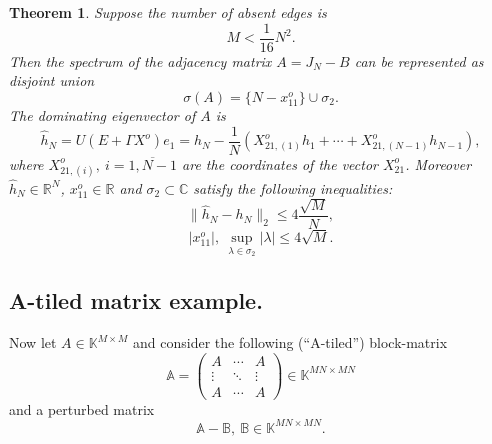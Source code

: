 \documentclass[a4paper]{jpconf}
\newtheorem{nkjpcsthm}{Theorem}
\begin{document}
\begin{nkjpcsthm}
    Suppose the number of absent edges is
    \[ M < \frac{1}{16} N^2. \]
    Then the spectrum of the adjacency matrix \( A = J_N - B \)
        can be represented as disjoint union
    \[
        \sigma(A) = \{ N - x_{11}^o \} \cup \sigma_2.
    \]
    The dominating eigenvector of \( A \) is
    \[
        \hat{h}_N = U(E+\Gamma X^o) e_1 =
            h_N - \frac1N (X_{21,(1)}^o h_1 + \cdots + X_{21, (N{-}1)}^o h_{N{-}1}),
    \]
    where \( X_{21,(i)}^o,\ i=\overline{1,N{-}1} \) are the coordinates
    of the vector \( X_{21}^o \).
    Moreover \( \hat{h}_N\in\mathbb{R}^{N} \),
    \( x_{11}^o\in\mathbb{R} \) and \( \sigma_2\subset\mathbb{C} \)
    satisfy the following inequalities:
    \[
        \|\hat{h}_N - h_N\|_2 \leq 4\frac{\sqrt{M}}{N},
    \]
    \[
        \lvert x_{11}^o \rvert,
        \ \sup_{\lambda\in\sigma_2} \lvert\lambda\rvert \leq 4\sqrt{M}.
    \]
\end{nkjpcsthm}

\subsection*{A-tiled matrix example.}

Now let \( A\in\mathbb{K}^{M{\times}M} \)
    and consider the following (``A-tiled'') block-matrix
    \[
        \mathbb{A} =
        \begin{pmatrix}
            A & \cdots & A \\
            \vdots & \ddots & \vdots \\
            A & \cdots & A
        \end{pmatrix}
        \in\mathbb{K}^{{MN}{\times}{MN}}
    \]
    and a perturbed matrix
    \[
        \mathbb{A} - \mathbb{B},\ \mathbb{B}\in\mathbb{K}^{{MN}{\times}{MN}}.
    \]
\end{document}
